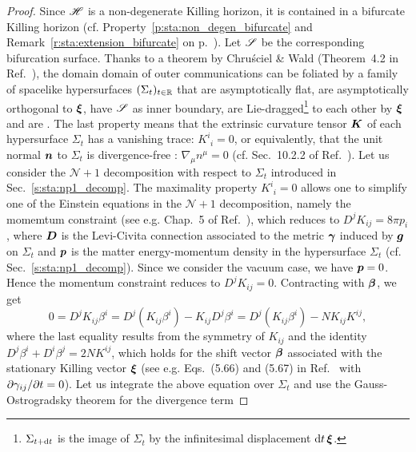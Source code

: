 \begin{proof}
Since $\mathscr{H}$ is a non-degenerate Killing horizon, it is contained in a bifurcate Killing horizon
(cf. Property~\ref{p:sta:non_degen_bifurcate} and Remark~\ref{r:sta:extension_bifurcate} on p.~\pageref{r:sta:extension_bifurcate}).
Let $\mathscr{S}$ be the corresponding bifurcation surface.
Thanks to a theorem by Chru\'sciel \&
Wald (Theorem~4.2 in Ref.~\cite{ChrusW94a}),
the domain domain of outer communications can be foliated by a family of
spacelike hypersurfaces $(\Sigma_t)_{t\in\mathbb{R}}$
that are asymptotically flat, are asymptotically orthogonal to $\bm{\xi}$,
have $\mathscr{S}$ as inner boundary, are Lie-dragged\footnote{$\Sigma_{t+\mathrm{d} t}$ is the image of $\Sigma_t$ by the infinitesimal displacement $\mathrm{d} t\, \bm{\xi}$.}
to each other by $\bm{\xi}$ and are .
The last property means that the
extrinsic curvature
tensor $\bm{K}$ of each hypersurface $\Sigma_t$
has a vanishing trace: $K^i_{\ \, i} = 0$, or equivalently, that
the unit normal $\bm{n}$ to $\Sigma_t$ is divergence-free : $\nabla_\mu n^\mu = 0$
(cf. Sec.~10.2.2 of Ref.~\cite{Gourg12}).
Let us consider the $\mathcal{N}+1$ decomposition with respect to $\Sigma_t$
introduced in Sec.~\ref{s:sta:np1_decomp}.
The maximality property $K^i_{\ \, i} = 0$ allows one
to simplify one of the Einstein equations in the $\mathcal{N}+1$ decomposition,
namely the momemtum constraint (see e.g. Chap.~5 of Ref.~\cite{Gourg12}),
which reduces to $D^j K_{ij} = 8\pi p_i$, where $\bm{D}$ is the Levi-Civita connection
associated to the metric $\bm{\gamma}$ induced by $\bm{g}$ on $\Sigma_t$ and $\bm{p}$ is the matter energy-momentum density in the hypersurface $\Sigma_t$ (cf. Sec.~\ref{s:sta:np1_decomp}).
Since we consider the vacuum case, we have $\bm{p} = 0$. Hence the momentum
constraint reduces to $D^j K_{ij} = 0$. Contracting with $\bm{\beta}$, we get
\[
    0 = D^j K_{ij} \beta^i
    =  D^j \left( K_{ij} \beta^i \right) - K_{ij} D^j \beta^i
     =  D^j \left( K_{ij} \beta^i \right) - N K_{ij} K^{ij}   ,
\]
where the last equality results from the symmetry of $K_{ij}$ and the identity
$D^j \beta^i + D^i \beta^j = 2N K^{ij}$, which holds for the shift vector $\bm{\beta}$
associated with the stationary Killing vector $\bm{\xi}$ (see e.g. Eqs.~(5.66) and
(5.67) in Ref.~\cite{Gourg12} with ${\partial \gamma_{ij}}/{\partial t} = 0$).
Let us integrate the above equation over $\Sigma_t$ and
use the Gauss-Ostrogradsky theorem for the divergence term

\end{proof}
